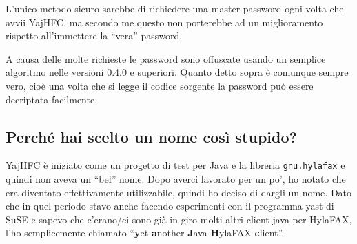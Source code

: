 \documentclass[a4paper,10pt]{scrartcl}
\begin{document}
L'unico metodo sicuro sarebbe di richiedere una master password ogni volta
che avvii YajHFC, ma secondo me questo non porterebbe ad un miglioramento rispetto
all'immettere la ``vera'' password.

A causa delle molte richieste le password sono offuscate usando un semplice algoritmo nelle versioni 0.4.0 e superiori.
Quanto detto sopra è comunque sempre vero, cioè una volta che si legge il codice sorgente la password può essere decriptata facilmente.

\subsection{Perché hai scelto un nome così stupido?}

YajHFC è iniziato come un progetto di test per Java e la libreria \texttt{gnu.hylafax} e quindi
non aveva un ``bel'' nome. Dopo averci lavorato per un po', ho notato che era diventato 
effettivamente utilizzabile, quindi ho deciso di dargli un nome.
Dato che in quel periodo stavo anche facendo esperimenti con il programma yast di SuSE e sapevo che
c'erano/ci sono già in giro molti altri client java per HylaFAX, l'ho semplicemente chiamato
``\textbf{y}et \textbf{a}nother \textbf{J}ava \textbf{H}ylaFAX \textbf{c}lient''. 
\end{document}
